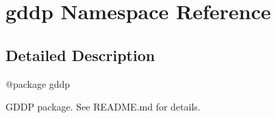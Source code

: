 \hypertarget{namespacegddp}{}\section{gddp Namespace Reference}
\label{namespacegddp}


\subsection{Detailed Description}
\begin{DoxyVerb}@package gddp

GDDP package. See README.md for details.\end{DoxyVerb}
 